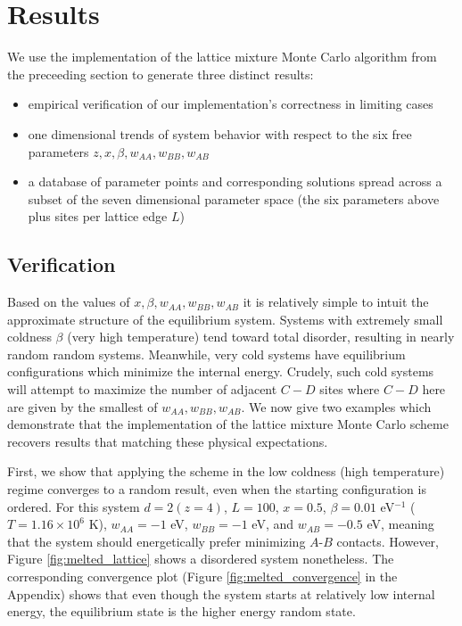 \documentclass[10pt]{article}
\begin{document}
\section{Results}

We use the implementation of the lattice mixture Monte Carlo algorithm from the preceeding section to generate three distinct results:
\begin{itemize}
    \item empirical verification of our implementation's correctness in limiting cases
    \item one dimensional trends of system behavior with respect to the six free parameters $z,x,\beta,w_{AA},w_{BB},w_{AB}$
    \item a database of parameter points and corresponding solutions spread across a subset of the seven dimensional parameter space (the six parameters above plus sites per lattice edge $L$)
\end{itemize}

\subsection{Verification}
Based on the values of $x,\beta,w_{AA},w_{BB},w_{AB}$ it is relatively simple to intuit the approximate structure of the equilibrium system.
Systems with extremely small coldness $\beta$ (very high temperature) tend toward total disorder, resulting in nearly random random systems.
Meanwhile, very cold systems have equilibrium configurations which minimize the internal energy.
Crudely, such cold systems will attempt to maximize the number of adjacent $C-D$ sites where $C-D$ here are given by the smallest of $w_{AA},w_{BB},w_{AB}$.
We now give two examples which demonstrate that the implementation of the lattice mixture Monte Carlo scheme recovers results that matching these physical expectations.

First, we show that applying the scheme in the low coldness (high temperature) regime converges to a random result, even when the starting configuration is ordered.
For this system $d=2 (z=4)$, $L=100$, $x=0.5$, $\beta = 0.01$ eV$^{-1}$ ($T=1.16 \times 10^6$ K), $w_{AA}=-1$ eV, $w_{BB} = -1$ eV, and $w_{AB} = -0.5$ eV, meaning that the system should energetically prefer minimizing $A$-$B$ contacts.
However, Figure \ref{fig:melted_lattice} shows a disordered system nonetheless.
The corresponding convergence plot (Figure \ref{fig:melted_convergence} in the Appendix) shows that even though the system starts at relatively low internal energy, the equilibrium state is the higher energy random state.
\end{document}
